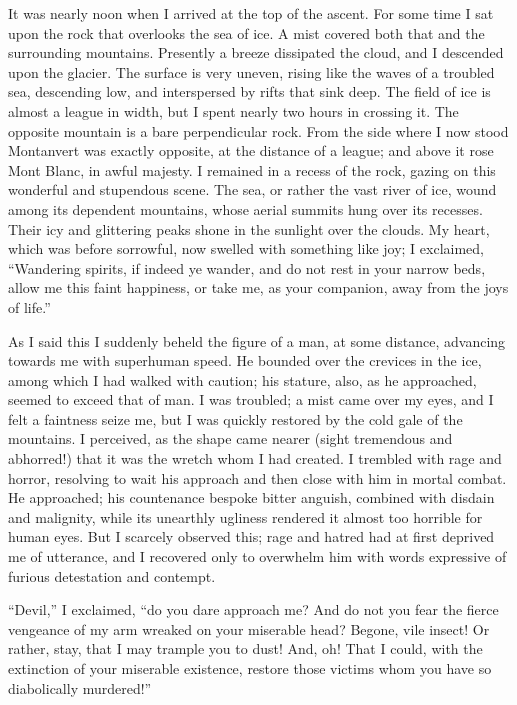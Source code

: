 \documentclass[12pt,openright]{book}
\begin{document}
It was nearly noon when I arrived at the top of the ascent. For some time I sat upon the rock that overlooks the sea of ice. A mist covered both that and the surrounding mountains. Presently a breeze dissipated the cloud, and I descended upon the glacier. The surface is very uneven, rising like the waves of a troubled sea, descending low, and interspersed by rifts that sink deep. The field of ice is almost a league in width, but I spent nearly two hours in crossing it. The opposite mountain is a bare perpendicular rock. From the side where I now stood Montanvert was exactly opposite, at the distance of a league; and above it rose Mont Blanc, in awful majesty. I remained in a recess of the rock, gazing on this wonderful and stupendous scene. The sea, or rather the vast river of ice, wound among its dependent mountains, whose aerial summits hung over its recesses. Their icy and glittering peaks shone in the sunlight over the clouds. My heart, which was before sorrowful, now swelled with something like joy; I exclaimed, “Wandering spirits, if indeed ye wander, and do not rest in your narrow beds, allow me this faint happiness, or take me, as your companion, away from the joys of life.”

As I said this I suddenly beheld the figure of a man, at some distance, advancing towards me with superhuman speed. He bounded over the crevices in the ice, among which I had walked with caution; his stature, also, as he approached, seemed to exceed that of man. I was troubled; a mist came over my eyes, and I felt a faintness seize me, but I was quickly restored by the cold gale of the mountains. I perceived, as the shape came nearer (sight tremendous and abhorred!) that it was the wretch whom I had created. I trembled with rage and horror, resolving to wait his approach and then close with him in mortal combat. He approached; his countenance bespoke bitter anguish, combined with disdain and malignity, while its unearthly ugliness rendered it almost too horrible for human eyes. But I scarcely observed this; rage and hatred had at first deprived me of utterance, and I recovered only to overwhelm him with words expressive of furious detestation and contempt.

“Devil,” I exclaimed, “do you dare approach me? And do not you fear the fierce vengeance of my arm wreaked on your miserable head? Begone, vile insect! Or rather, stay, that I may trample you to dust! And, oh! That I could, with the extinction of your miserable existence, restore those victims whom you have so diabolically murdered!”
\end{document}
